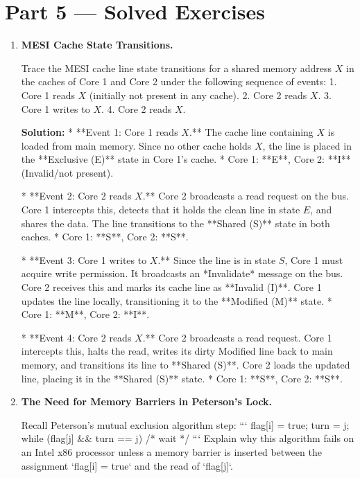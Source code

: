 \documentclass[12pt, a4paper]{book}
\begin{document}
\section{Part 5 --- Solved Exercises}

\begin{problembox}
\begin{enumerate}[label=\textbf{E\arabic*.}]
  \item \textbf{MESI Cache State Transitions.}
  
        Trace the MESI cache line state transitions for a shared memory address $X$ in the caches of Core 1 and Core 2 under the following sequence of events:
        1. Core 1 reads $X$ (initially not present in any cache).
        2. Core 2 reads $X$.
        3. Core 1 writes to $X$.
        4. Core 2 reads $X$.
        
        \textbf{Solution:}
        * **Event 1: Core 1 reads $X$.**
          The cache line containing $X$ is loaded from main memory. Since no other cache holds $X$, the line is placed in the **Exclusive (E)** state in Core 1's cache.
          * Core 1: **E**, Core 2: **I** (Invalid/not present).
          
        * **Event 2: Core 2 reads $X$.**
          Core 2 broadcasts a read request on the bus. Core 1 intercepts this, detects that it holds the clean line in state $E$, and shares the data. The line transitions to the **Shared (S)** state in both caches.
          * Core 1: **S**, Core 2: **S**.
          
        * **Event 3: Core 1 writes to $X$.**
          Since the line is in state $S$, Core 1 must acquire write permission. It broadcasts an *Invalidate* message on the bus. Core 2 receives this and marks its cache line as **Invalid (I)**. Core 1 updates the line locally, transitioning it to the **Modified (M)** state.
          * Core 1: **M**, Core 2: **I**.
          
        * **Event 4: Core 2 reads $X$.**
          Core 2 broadcasts a read request. Core 1 intercepts this, halts the read, writes its dirty Modified line back to main memory, and transitions its line to **Shared (S)**. Core 2 loads the updated line, placing it in the **Shared (S)** state.
          * Core 1: **S**, Core 2: **S**.
          
  \item \textbf{The Need for Memory Barriers in Peterson's Lock.}
  
        Recall Peterson's mutual exclusion algorithm step:
        ```
          flag[i] = true;
          turn = j;
          while (flag[j] && turn == j) { /* wait */ }
        ```
        Explain why this algorithm fails on an Intel x86 processor unless a memory barrier is inserted between the assignment `flag[i] = true` and the read of `flag[j]`.
        

\end{enumerate}
\end{problembox}
\end{document}
